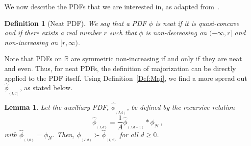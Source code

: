 \documentclass[twocolumn]{autart}
\newtheorem{lemma}[theorem]{Lemma}
\newtheorem{definition}{Definition}[section]
\begin{document}
We now describe the PDFs that we are interested in, as adapted from~\cite{Lipsa2011}.
\begin{definition} [Neat PDF] \label{Def:NeatPDF}
We say that a PDF $\phi$ is \emph{neat} if it is quasi-concave and if there exists a real number $r$ such that $\phi$ is non-decreasing on $(-\infty,r]$ and non-increasing on $[r,\infty)$.
\end{definition}

Note that PDFs on $\mathbb{R}$ are symmetric non-increasing if and only if they are neat and even. Thus, for neat PDFs, the definition of majorization can be directly applied to the PDF itself. Using Definition~\ref{Def:Maj}, we find a more spread out $\hat{\phi}_{_{(I,d)}}$, as stated below.
\begin{lemma} \label{Lemma:HatPhi}
Let the auxiliary PDF, $\hat{\phi}_{_{(I,d)}}$, be defined by the recursive relation
\begin{equation*}
\hat{\phi}_{_{(I,d)}} = \frac{1}{A}\hat{\phi}_{_{(I,d-1)}} \ast \phi_N \; ,
\end{equation*}
with $\hat{\phi}_{_{(I,0)}} = \phi_N$. Then, $\phi_{_{(I,d)}} \succ \hat{\phi}_{_{(I,d)}}$ for all $d \ge 0$.
\end{lemma}
\end{document}
